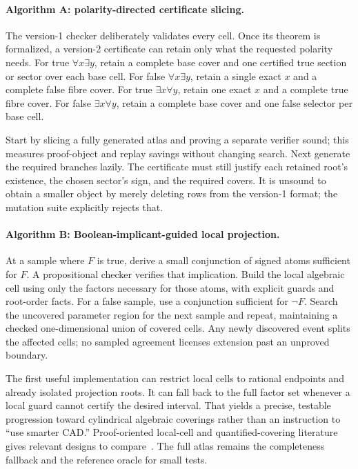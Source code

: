 \paragraph{Algorithm A: polarity-directed certificate slicing.}
The version-1 checker deliberately validates every cell. Once its theorem is formalized, a version-2 certificate can retain only what the requested polarity needs. For true $\forall x\exists y$, retain a complete base cover and one certified true section or sector over each base cell. For false $\forall x\exists y$, retain a single exact $x$ and a complete false fibre cover. For true $\exists x\forall y$, retain one exact $x$ and a complete true fibre cover. For false $\exists x\forall y$, retain a complete base cover and one false selector per base cell.

Start by slicing a fully generated atlas and proving a separate verifier sound; this measures proof-object and replay savings without changing search. Next generate the required branches lazily. The certificate must still justify each retained root's existence, the chosen sector's sign, and the required covers. It is unsound to obtain a smaller object by merely deleting rows from the version-1 format; the mutation suite explicitly rejects that.

\paragraph{Algorithm B: Boolean-implicant-guided local projection.}
At a sample where $F$ is true, derive a small conjunction of signed atoms sufficient for $F$. A propositional checker verifies that implication. Build the local algebraic cell using only the factors necessary for those atoms, with explicit guards and root-order facts. For a false sample, use a conjunction sufficient for $\neg F$. Search the uncovered parameter region for the next sample and repeat, maintaining a checked one-dimensional union of covered cells. Any newly discovered event splits the affected cells; no sampled agreement licenses extension past an unproved boundary.

The first useful implementation can restrict local cells to rational endpoints and already isolated projection roots. It can fall back to the full factor set whenever a local guard cannot certify the desired interval. That yields a precise, testable progression toward cylindrical algebraic coverings rather than an instruction to ``use smarter CAD.'' Proof-oriented local-cell and quantified-covering literature gives relevant designs to compare~\cite{nalbach-cell,nalbach-cover}. The full atlas remains the completeness fallback and the reference oracle for small tests.

